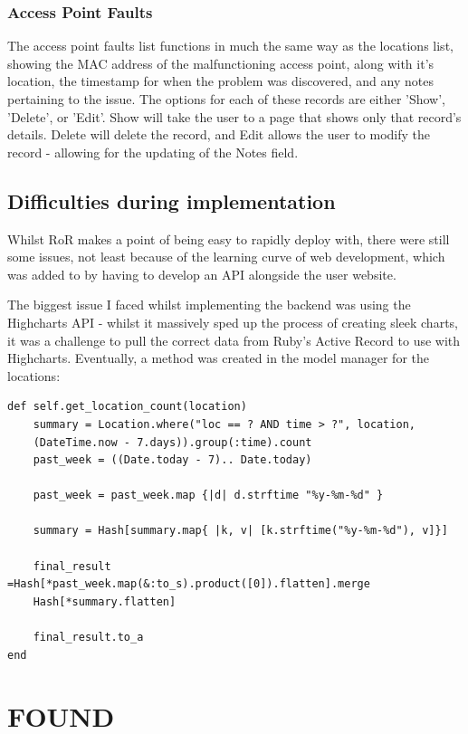 \documentclass[11pt]{informatics-report}
\begin{document}
\subsubsection{Access Point Faults}

The access point faults list functions in much the same way as the locations list, showing the MAC address of the malfunctioning access point, along with it's location, the timestamp for when the problem was discovered, and any notes pertaining to the issue. The options for each of these records are either 'Show', 'Delete', or 'Edit'. Show will take the user to a page that shows only that record's details. Delete will delete the record, and Edit allows the user to modify the record - allowing for the updating of the Notes field. 

\subsection{Difficulties during implementation}

Whilst RoR makes a point of being easy to rapidly deploy with, there were still some issues, not least because of the learning curve of web development, which was added to by having to develop an API alongside the user website.

The biggest issue I faced whilst implementing the backend was using the Highcharts API - whilst it massively sped up the process of creating sleek charts, it was a challenge to pull the correct data from Ruby's Active Record to use with Highcharts. Eventually, a method was created in the model manager for the locations: 

\begin{verbatim}
def self.get_location_count(location)
	summary = Location.where("loc == ? AND time > ?", location, 
	(DateTime.now - 7.days)).group(:time).count
	past_week = ((Date.today - 7).. Date.today)

	past_week = past_week.map {|d| d.strftime "%y-%m-%d" }

	summary = Hash[summary.map{ |k, v| [k.strftime("%y-%m-%d"), v]}]

	final_result =Hash[*past_week.map(&:to_s).product([0]).flatten].merge 
	Hash[*summary.flatten]

	final_result.to_a
end
\end{verbatim}

\section{FOUND}
\end{document}
